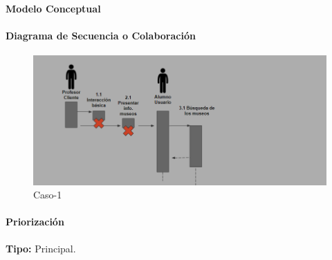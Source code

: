 \paragraph{Modelo Conceptual}


\paragraph{Diagrama de Secuencia o Colaboración}

\begin{figure}[H]
\centerline{\includegraphics[width=15cm]{imgs/CasoUso_5_2.PNG}}
\caption{Caso-1}
\label{fig}
\end{figure}

\paragraph{Priorización}
{\textbf {Tipo:}}
Principal.